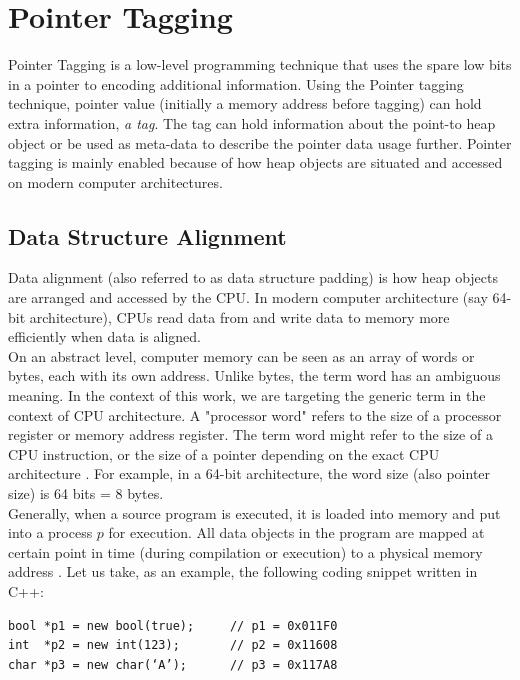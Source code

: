 \section{Pointer Tagging}
\label{sec:preliminaries:pointertagging}

Pointer Tagging \cite{taggedpointer} is a low-level programming technique that uses the spare low bits in a pointer to encoding additional information. Using the Pointer tagging technique, pointer value (initially a memory address before tagging) can hold extra information, \textit{a tag}. The tag can hold information about the point-to heap object or be used as meta-data to describe the pointer data usage further. Pointer tagging is mainly enabled because of how heap objects are situated and accessed on modern computer architectures.

\subsection{Data Structure Alignment}
\label{sec:preliminaries:data_alignment}
Data alignment (also referred to as data structure padding) is how heap objects are arranged and accessed by the CPU. In modern computer architecture (say 64-bit architecture), CPUs read data from and write data to memory more efficiently when data is aligned.  \\

On an abstract level, computer memory can be seen as an array of words or bytes, each with its own address. Unlike bytes, the term word has an ambiguous meaning. In the context of this work, we are targeting the generic term in the context of CPU architecture. A "processor word" refers to the size of a processor register or memory address register. The term word might refer to the size of a CPU instruction, or the size of a pointer depending on the exact CPU architecture \cite{OSConcept}. For example, in a 64-bit architecture, the word size (also pointer size) is 64 bits = 8 bytes.\\

Generally, when a source program is executed, it is loaded into memory and put into a process $p$ for execution. All data objects in the program are mapped at certain point in time (during compilation or execution) to a physical memory address \cite{OSConcept}. Let us take, as an example, the following coding snippet written in C++:

\begin{verbatim}
bool *p1 = new bool(true);     // p1 = 0x011F0
int  *p2 = new int(123);       // p2 = 0x11608
char *p3 = new char(‘A’);      // p3 = 0x117A8
\end{verbatim}

